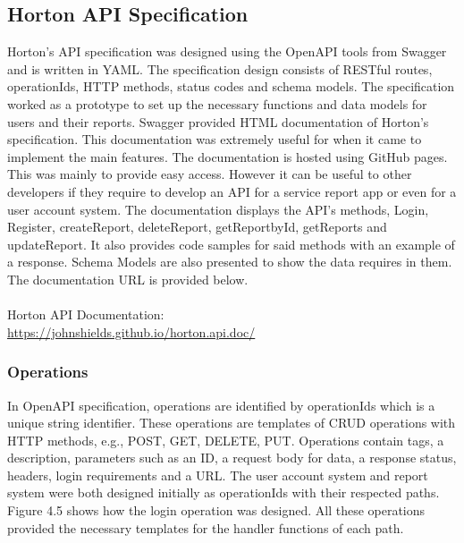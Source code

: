 \subsection{Horton API Specification}
Horton's API specification was designed using the OpenAPI tools from Swagger and is written in YAML. The specification design consists of RESTful routes, operationIds, HTTP methods, status codes and schema models. 
The specification worked as a prototype to set up the necessary functions and data models for users and their reports. 
Swagger provided HTML documentation of Horton's specification. This documentation was extremely useful for when it came to implement the main features. The documentation is hosted using GitHub pages. This was mainly to provide easy access. However it can be useful to other developers if they require to develop an API for a service report app or even for a user account system. The documentation displays the API's methods, Login, Register, createReport, deleteReport, getReportbyId, getReports and updateReport. It also provides code samples for said methods with an example of a response. Schema Models are also presented to show the data requires in them. The documentation URL is provided below.
\\\\ Horton API Documentation: \\ 
\url{https://johnshields.github.io/horton.api.doc/}

\subsubsection{Operations}
In OpenAPI specification, operations are identified by operationIds which is a unique string identifier. These operations are templates of CRUD operations with HTTP methods, e.g., POST, GET, DELETE, PUT. Operations contain tags, a description, parameters such as an ID, a request body for data, a response status, headers, login requirements and a URL. The user account system and report system were both designed initially as operationIds with their respected paths. Figure 4.5 shows how the login operation was designed. All these operations provided the necessary templates for the handler functions of each path. 

